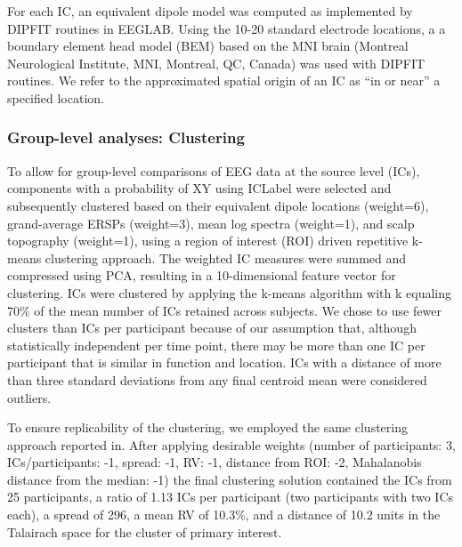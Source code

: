For each IC, an equivalent dipole model was computed as implemented by DIPFIT routines in EEGLAB. Using the 10-20 standard electrode locations, a a boundary element head model (BEM) based on the MNI brain (Montreal Neurological Institute, MNI, Montreal, QC, Canada) was used with DIPFIT routines. We refer to the approximated spatial origin of an IC as “in or near” a specified location.

\subsubsection{Group-level analyses: Clustering}
To allow for group-level comparisons of EEG data at the source level (ICs), components with a probability of XY using ICLabel were selected and subsequently clustered based on their equivalent dipole locations (weight=6), grand-average ERSPs (weight=3), mean log spectra (weight=1), and scalp topography (weight=1), using a region of interest (ROI) driven repetitive k-means clustering approach\citep{cleaning_FH2018}. The weighted IC measures were summed and compressed using PCA, resulting in a 10-dimensional feature vector for clustering. ICs were clustered by applying the k-means algorithm with k equaling 70\% of the mean number of ICs retained across subjects. We chose to use fewer clusters than ICs per participant because of our assumption that, although statistically independent per time point, there may be more than one IC per participant that is similar in function and location. ICs with a distance of more than three standard deviations from any final centroid mean were considered outliers.

To ensure replicability of the clustering, we employed the same clustering approach reported in\cite{cleaning_FH2018}. After applying desirable weights (number of participants: 3, ICs/participants: -1, spread: -1, RV: -1, distance from ROI: -2, Mahalanobis distance from the median: -1) the final clustering solution contained the ICs from 25 participants, a ratio of 1.13 ICs per participant (two participants with two ICs each), a spread of 296, a mean RV of 10.3\%, and a distance of 10.2 units in the Talairach space for the cluster of primary interest.